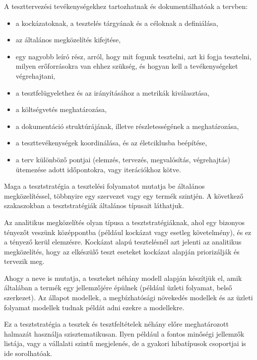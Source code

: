 A teszttervezési tevékenységekhez tartozhatnak és dokumentálhatóak a tervben:
\begin{itemize}
\item a kockázatoknak, a tesztelés tárgyának és a céloknak a definiálása,
\item az általános megközelítés kifejtése,
\item egy nagyobb leíró rész, arról, hogy mit fogunk tesztelni, azt ki fogja tesztelni, milyen erőforrásokra van ehhez szükség, és hogyan kell a tevékenységeket végrehajtani,
\item a tesztfelügyelethez és az irányításához a metrikák kiválasztása,
\item a költségvetés meghatározása,
\item a dokumentáció struktúrájának, illetve részletességének a meghatározása,
\item a teszttevékenységek koordinálása, és az életciklusba beépítése,
\item a terv különböző pontjai (elemzés, tervezés, megvalósítás, végrehajtás) ütemezése adott időpontokra, vagy iterációkhoz kötve.
\end{itemize}


Maga a tesztstratégia a tesztelési folyamatot mutatja be általános megközelítéssel, többnyire egy szervezet vagy egy termék szintjén.
A következő szakaszokban a tesztstratégiák általános típusait láthatjuk.


Az analitikus megközelítés olyan típusa a tesztstratégiáknak, ahol egy bizonyos tényezőt veszünk középpontba (például kockázat vagy esetleg követelmény), és ez a tényező kerül elemzésre.
Kockázat alapú tesztelésnél azt jelenti az analitikus megközelítés, hogy az elkészülő teszt eseteket kockázat alapján priorizálják és tervezik meg.


Ahogy a neve is mutatja, a teszteket néhány modell alapján készítjük el, amik általában a termék egy jellemzőjére épülnek (például üzleti folyamat, belső szerkezet).	Az állapot modellek, a megbízhatósági növekedés modellek és az üzleti folyamat modellek tudnak példát adni ezekre a modellekre.


Ez a tesztstratégia a tesztek és tesztfeltételek néhány előre meghatározott halmazát használja szisztematikusan. Ilyen például a fontos minőségi jellemzők listája, vagy a vállalati szintű megjelenés, de a  gyakori hibatípusok csoportjai is ide sorolhatóak.

